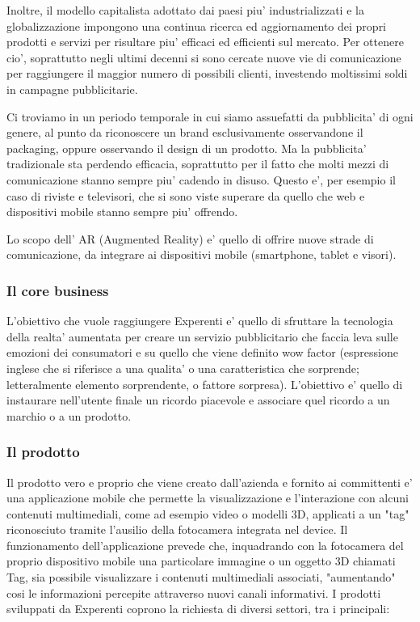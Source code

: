 Inoltre, il modello capitalista adottato dai paesi piu' industrializzati e la globalizzazione impongono una continua ricerca ed aggiornamento dei propri prodotti e servizi per risultare piu' efficaci ed efficienti sul mercato. Per ottenere cio', soprattutto negli ultimi decenni si sono cercate nuove vie di comunicazione per raggiungere il maggior numero di possibili clienti, investendo moltissimi soldi in campagne pubblicitarie.

Ci troviamo in un periodo temporale in cui siamo assuefatti da pubblicita' di ogni genere, al punto da riconoscere un brand esclusivamente osservandone il packaging, oppure osservando il design di un prodotto.
Ma la pubblicita' tradizionale sta perdendo efficacia, soprattutto per il fatto che molti mezzi di comunicazione stanno sempre piu' cadendo in disuso. Questo e', per esempio il caso di riviste e televisori, che si sono viste superare da quello che web e dispositivi mobile stanno sempre piu' offrendo.

Lo scopo dell' AR (Augmented Reality) e' quello di offrire nuove strade di comunicazione, da integrare ai dispositivi mobile (smartphone, tablet e visori).

\subsubsection{Il core business}
L'obiettivo che vuole raggiungere Experenti e' quello di sfruttare la tecnologia della realta' aumentata per creare un servizio pubblicitario che faccia leva sulle emozioni dei consumatori e su quello che viene definito wow factor (espressione inglese che si riferisce a una qualita' o una caratteristica che sorprende; letteralmente elemento sorprendente, o fattore sorpresa). L'obiettivo e' quello di instaurare nell'utente finale un ricordo piacevole e associare quel ricordo a un marchio o a un prodotto.

\subsubsection{Il prodotto}
Il prodotto vero e proprio che viene creato dall'azienda e fornito ai committenti e' una applicazione mobile che permette la visualizzazione e l'interazione con alcuni contenuti multimediali, come ad esempio video o modelli 3D, applicati a un "tag" riconosciuto tramite l'ausilio della fotocamera integrata nel device.
Il funzionamento dell'applicazione prevede che, inquadrando con la fotocamera del proprio dispositivo mobile una particolare immagine o un oggetto 3D chiamati Tag, sia possibile visualizzare i contenuti multimediali associati, "aumentando" cosi le informazioni percepite attraverso nuovi canali informativi.
I prodotti sviluppati da Experenti coprono la richiesta di diversi settori, tra i principali:

